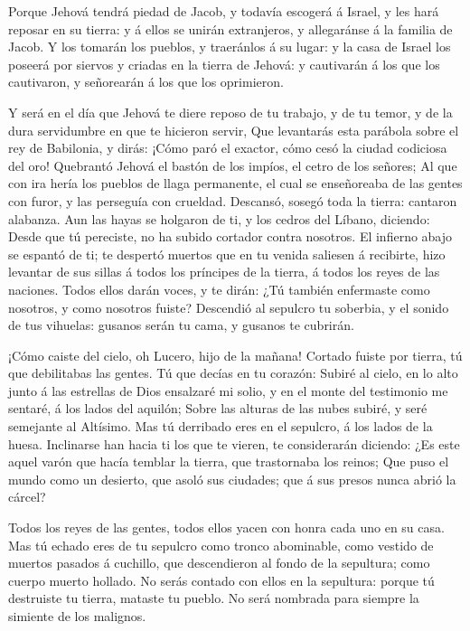  Porque Jehová tendrá piedad de Jacob, y todavía escogerá á
Israel, y les hará reposar en su tierra: y á ellos se unirán
extranjeros, y allegaránse á la familia de Jacob.  Y los
tomarán los pueblos, y traeránlos á su lugar: y la casa de Israel los
poseerá por siervos y criadas en la tierra de Jehová: y cautivarán á los
que los cautivaron, y señorearán á los que los oprimieron.

 Y será en el día que Jehová te diere reposo de tu trabajo,
y de tu temor, y de la dura servidumbre en que te hicieron servir,
 Que levantarás esta parábola sobre el rey de Babilonia, y
dirás: ¡Cómo paró el exactor, cómo cesó la ciudad codiciosa del oro!
 Quebrantó Jehová el bastón de los impíos, el cetro de los
señores;  Al que con ira hería los pueblos de llaga
permanente, el cual se enseñoreaba de las gentes con furor, y las
perseguía con crueldad.  Descansó, sosegó toda la tierra:
cantaron alabanza.  Aun las hayas se holgaron de ti, y los
cedros del Líbano, diciendo: Desde que tú pereciste, no ha subido
cortador contra nosotros.  El infierno abajo se espantó de
ti; te despertó muertos que en tu venida saliesen á recibirte, hizo
levantar de sus sillas á todos los príncipes de la tierra, á todos los
reyes de las naciones.  Todos ellos darán voces, y te
dirán: ¿Tú también enfermaste como nosotros, y como nosotros fuiste?
 Descendió al sepulcro tu soberbia, y el sonido de tus
vihuelas: gusanos serán tu cama, y gusanos te cubrirán.

 ¡Cómo caiste del cielo, oh Lucero, hijo de la mañana!
Cortado fuiste por tierra, tú que debilitabas las gentes. 
Tú que decías en tu corazón: Subiré al cielo, en lo alto junto á las
estrellas de Dios ensalzaré mi solio, y en el monte del testimonio me
sentaré, á los lados del aquilón;  Sobre las alturas de las
nubes subiré, y seré semejante al Altísimo.  Mas tú
derribado eres en el sepulcro, á los lados de la huesa. 
Inclinarse han hacia ti los que te vieren, te considerarán diciendo: ¿Es
este aquel varón que hacía temblar la tierra, que trastornaba los
reinos;  Que puso el mundo como un desierto, que asoló sus
ciudades; que á sus presos nunca abrió la cárcel?

 Todos los reyes de las gentes, todos ellos yacen con honra
cada uno en su casa.  Mas tú echado eres de tu sepulcro
como tronco abominable, como vestido de muertos pasados á cuchillo, que
descendieron al fondo de la sepultura; como cuerpo muerto hollado.
 No serás contado con ellos en la sepultura: porque tú
destruiste tu tierra, mataste tu pueblo. No será nombrada para siempre
la simiente de los malignos.

